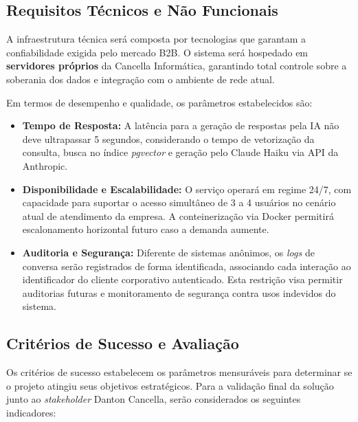 \documentclass[a4paper,12pt,Times]{article}
\begin{document}
\subsection{Requisitos Técnicos e Não Funcionais}

A infraestrutura técnica será composta por tecnologias que garantam a confiabilidade
exigida pelo mercado B2B\@. O sistema será hospedado em \textbf{servidores próprios} da
Cancella Informática, garantindo total controle sobre a soberania dos dados e integração
com o ambiente de rede atual.

Em termos de desempenho e qualidade, os parâmetros estabelecidos são:

\begin{itemize}
    \item \textbf{Tempo de Resposta:} A latência para a geração de respostas pela IA não
          deve ultrapassar 5 segundos, considerando o tempo de vetorização da consulta,
          busca no índice \textit{pgvector} e geração pelo Claude Haiku via API da Anthropic.
    \item \textbf{Disponibilidade e Escalabilidade:} O serviço operará em regime 24/7, com
          capacidade para suportar o acesso simultâneo de 3 a 4 usuários no cenário atual de
          atendimento da empresa. A conteinerização via Docker permitirá escalonamento
          horizontal futuro caso a demanda aumente.
    \item \textbf{Auditoria e Segurança:} Diferente de sistemas anônimos, os \textit{logs}
          de conversa serão registrados de forma identificada, associando cada interação ao
          identificador do cliente corporativo autenticado. Esta restrição visa permitir
          auditorias futuras e monitoramento de segurança contra usos indevidos do sistema.
\end{itemize}

\subsection{Critérios de Sucesso e Avaliação}

Os critérios de sucesso estabelecem os parâmetros mensuráveis para determinar se o projeto
atingiu seus objetivos estratégicos. Para a validação final da solução junto ao
\textit{stakeholder} Danton Cancella, serão considerados os seguintes indicadores:
\end{document}
